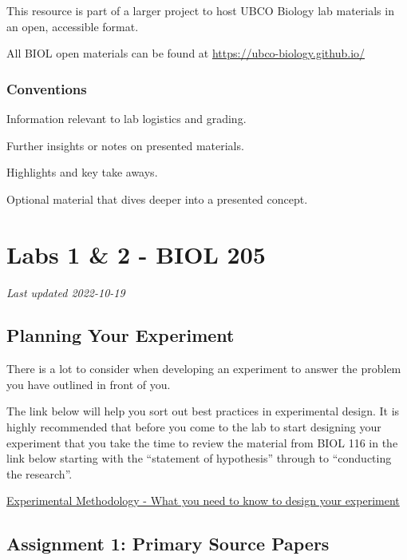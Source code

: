 \documentclass[
]{book}
\begin{document}
This resource is part of a larger project to host UBCO Biology lab materials in an open, accessible format.

All BIOL open materials can be found at \url{https://ubco-biology.github.io/}

\hypertarget{conventions}{%
\section*{Conventions}\label{conventions}}

Information relevant to lab logistics and grading.

Further insights or notes on presented materials.

Highlights and key take aways.

Optional material that dives deeper into a presented concept.

\hypertarget{part-labs-1-2---biol-205}{%
\part*{Labs 1 \& 2 - BIOL 205}\label{part-labs-1-2---biol-205}}

\emph{Last updated 2022-10-19}

\hypertarget{planning-your-experiment}{%
\chapter*{Planning Your Experiment}\label{planning-your-experiment}}

There is a lot to consider when developing an experiment to answer the problem you have outlined in front of you.

The link below will help you sort out best practices in experimental design. It is highly recommended that before you come to the lab to start designing your experiment that you take the time to review the material from BIOL 116 in the link below starting with the ``statement of hypothesis'' through to ``conducting the research''.

\href{https://ubco-biology.github.io/BIOL-116-Lab-Manual/statement-of-hypothesis.html}{Experimental Methodology - What you need to know to design your experiment}

\hypertarget{assignment-1-primary-source-papers}{%
\chapter*{Assignment 1: Primary Source Papers}\label{assignment-1-primary-source-papers}}
\end{document}
